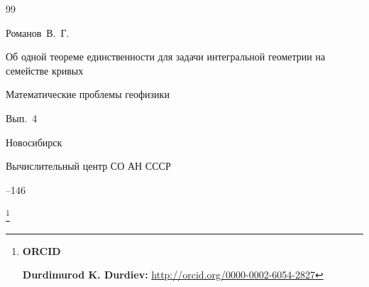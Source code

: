 \begin{thebibliography}{99}








\by Романов~В.~Г.

\paper Об одной теореме единственности для задачи интегральной геометрии на семействе кривых

\inbook Математические проблемы геофизики


\issueinfo Вып.~4

\publaddr Новосибирск

\publ Вычислительный центр СО АН СССР

--146



\end{thebibliography}



\RuDate



\newpage



\makeentitle







\thanks{{\bf ORCID}



{\bf Durdimurod K. Durdiev:} \url{http://orcid.org/0000-0002-6054-2827}





}









\EngRef



